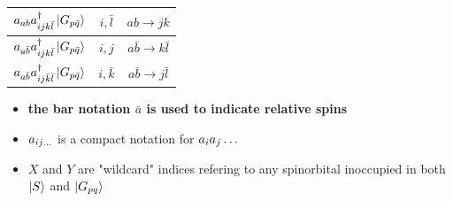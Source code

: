 \documentclass[./thesis.tex]{subfiles}
\begin{document}
\begin{table}
\begin{center}
\begin{tabular}{ c|c|c }
		\hline \rule{0pt}{3ex}
		$a_{ab} a^\dagger_{ijk \bar l} \ket {G_{p \bar q}}$			&$i,\bar l$		&$ab \rightarrow jk$		\\
		\hline \rule{0pt}{3ex}
		$a_{a  \bar b} a^\dagger_{ijk \bar l} \ket {G_{p \bar q}}$			&$i,j$		&$a \bar b \rightarrow k \bar l$		\\
		\hline \rule{0pt}{3ex}
		$a_{a  \bar b} a^\dagger_{ij \bar k \bar l} \ket {G_{p \bar q}}$			&$i,\bar k$		&$a \bar b \rightarrow j \bar l$		\\
	\end{tabular}
	
\end{center}
\begin{itemize}
\item
\textbf{the bar notation $\bar a$ is used to indicate relative spins}
\item
$a_{ij\ldots}$ is a compact notation for $a_{i} a_{j} \ldots$
\item
$X$ and $Y$ are "wildcard" indices refering to any spinorbital inoccupied in both $\ket S$ and $\ket {G_{pq}}$ 
\end{itemize}
\end{table}
\end{document}
